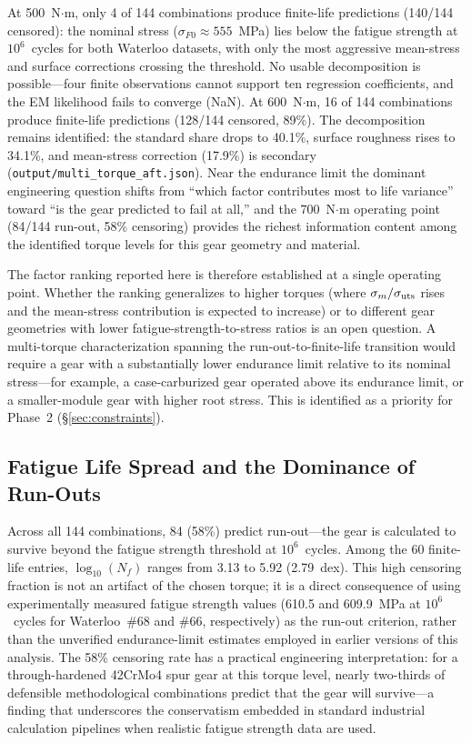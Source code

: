 \documentclass[twocolumn,12pt,a4paper]{article}
\begin{document}
At 500~N$\cdot$m, only 4 of 144 combinations produce finite-life
predictions (140/144 censored): the nominal stress
($\sigma_{F0} \approx 555$~MPa) lies below the fatigue strength
at $10^6$~cycles for both Waterloo datasets, with only the most
aggressive mean-stress and surface corrections crossing the
threshold. No usable decomposition is
possible---four finite observations cannot support ten regression
coefficients, and the EM likelihood fails to converge (NaN).
At 600~N$\cdot$m, 16 of 144 combinations produce finite-life
predictions (128/144 censored, 89\%). The decomposition remains
identified: the standard share drops to 40.1\%, surface roughness
rises to 34.1\%, and mean-stress correction (17.9\%) is secondary
(\texttt{output/multi\_torque\_aft.json}). Near the endurance limit
the dominant engineering question shifts from ``which factor
contributes most to life variance'' toward ``is the gear predicted to
fail at all,'' and the 700~N$\cdot$m operating point (84/144 run-out,
58\% censoring) provides the richest information content among the
identified torque levels for this gear geometry and material.

The factor ranking reported here is therefore established at a single
operating point. Whether the ranking generalizes to higher torques
(where $\sigma_m/\sigma_{\rm uts}$ rises and the mean-stress
contribution is expected to increase) or to different gear geometries
with lower fatigue-strength-to-stress ratios is an open question. A
multi-torque characterization spanning the run-out-to-finite-life
transition would require a gear with a substantially lower endurance
limit relative to its nominal stress---for example, a
case-carburized gear operated above its endurance limit, or a
smaller-module gear with higher root stress. This is identified as a
priority for Phase~2 (\S\ref{sec:constraints}).

\subsection{Fatigue Life Spread and the Dominance of Run-Outs}

Across all 144 combinations, 84 (58\%) predict run-out---the gear is
calculated to survive beyond the fatigue strength threshold at
$10^6$~cycles. Among the 60 finite-life entries, $\log_{10}(N_f)$
ranges from 3.13 to 5.92 (2.79~dex). This high censoring fraction is
not an artifact of the chosen torque; it is a direct consequence of
using experimentally measured fatigue strength values (610.5 and
609.9~MPa at $10^6$~cycles for Waterloo~\#68 and \#66, respectively)
as the run-out criterion, rather than the unverified endurance-limit
estimates employed in earlier versions of this analysis. The 58\%
censoring rate has a practical engineering interpretation: for a
through-hardened 42CrMo4 spur gear at this torque level, nearly
two-thirds of defensible methodological combinations predict that the
gear will survive---a finding that underscores the conservatism
embedded in standard industrial calculation pipelines when realistic
fatigue strength data are used.
\end{document}
